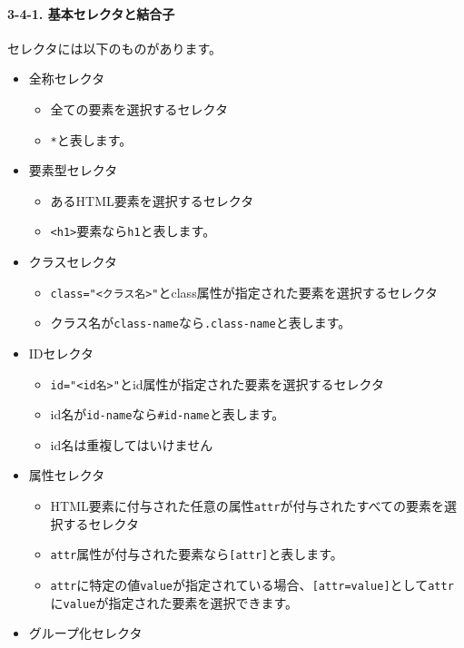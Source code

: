 \paragraph{3-4-1.
基本セレクタと結合子}\label{ux57faux672cux30bbux30ecux30afux30bfux3068ux7d50ux5408ux5b50}

セレクタには以下のものがあります。

\begin{itemize}
\tightlist
\item
  全称セレクタ

  \begin{itemize}
  \tightlist
  \item
    全ての要素を選択するセレクタ
  \item
    \texttt{*}と表します。
  \end{itemize}
\item
  要素型セレクタ

  \begin{itemize}
  \tightlist
  \item
    あるHTML要素を選択するセレクタ
  \item
    \texttt{\textless{}h1\textgreater{}}要素なら\texttt{h1}と表します。
  \end{itemize}
\item
  クラスセレクタ

  \begin{itemize}
  \tightlist
  \item
    \texttt{class="\textless{}クラス名\textgreater{}"}とclass属性が指定された要素を選択するセレクタ
  \item
    クラス名が\texttt{class-name}なら\texttt{.class-name}と表します。
  \end{itemize}
\item
  IDセレクタ

  \begin{itemize}
  \tightlist
  \item
    \texttt{id="\textless{}id名\textgreater{}"}とid属性が指定された要素を選択するセレクタ
  \item
    id名が\texttt{id-name}なら\texttt{\#id-name}と表します。
  \item
    id名は重複してはいけません
  \end{itemize}
\item
  属性セレクタ

  \begin{itemize}
  \tightlist
  \item
    HTML要素に付与された任意の属性\texttt{attr}が付与されたすべての要素を選択するセレクタ
  \item
    \texttt{attr}属性が付与された要素なら\texttt{{[}attr{]}}と表します。
  \item
    \texttt{attr}に特定の値\texttt{value}が指定されている場合、\texttt{{[}attr=value{]}}として\texttt{attr}に\texttt{value}が指定された要素を選択できます。
  \end{itemize}
\item
  グループ化セレクタ


\end{itemize}
